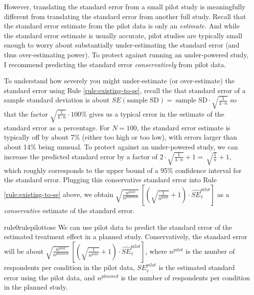 \documentclass[12pt]{article}
\begin{document}
However, translating the standard error from a small pilot study is meaningfully different from translating the standard error from another full study. Recall that the standard error estimate from the pilot data is only an \emph{estimate.} 
And while the standard error estimate is usually accurate, pilot studies are typically small enough to worry about substantially under-estimating the standard error (and thus
over-estimating power). 
To protect against running an under-powered study, I recommend predicting the standard error \emph{conservatively} from pilot data. 

To understand how severely you might under-estimate (or over-estimate)
the standard error using Rule \ref{rule:existing-to-se}, recall the that standard error of a sample standard deviation is about $SE\left( \text{sample SD} \right) = \ \text{sample SD} \cdot \sqrt{\frac{1}{4 \cdot n}}$ so that the factor $\sqrt{\frac{1}{4 \cdot n}} \cdot 100\%$ gives us a typical error in the estimate of the standard error as a percentage. 
For $N = 100$, the standard error estimate is typically off by about 7\% (either too high or too low), with errors larger than about 14\% being unusual. 
To protect against an under-powered study, we can increase the predicted standard error by a factor of $2 \cdot \sqrt{\frac{1}{4 \cdot n}} + 1 = \ \sqrt{\frac{1}{n}} + 1$, which roughly corresponds to the upper bound of a 95\% confidence interval for the standard error. 
Plugging this conservative standard error into Rule \ref{rule:existing-to-se} above, we obtain $\sqrt{\frac{n^{pilot}}{n^{planned}}}\ \left\lbrack \left( \sqrt{\frac{1}{n^{pilot}}} + 1 \right) \cdot {\widehat{SE}}_{\widehat{\tau}}^{pilot} \right\rbrack$
as a \emph{conservative} estimate of the standard error. 

\begin{restatable}{rule0}{rulepilottose}
\label{rule:pilot-to-se}
We can use pilot data to predict the standard error of the estimated treatment effect in a planned study. Conservatively, the standard error will be about $\sqrt{\frac{n^{pilot}}{n^{planned}}}\ \left\lbrack \left( \sqrt{\frac{1}{n^{pilot}}} + 1 \right) \cdot {\widehat{SE}}_{\widehat{\tau}}^{pilot} \right\rbrack$, where $n^{pilot}$ is the number of respondents per condition in the pilot data, $SE_{\widehat{\tau}}^{pilot}$ is the estimated standard error using the pilot data, and $n^{planned}$ is the number of respondents per condition in the planned study. 
\end{restatable}
\end{document}
